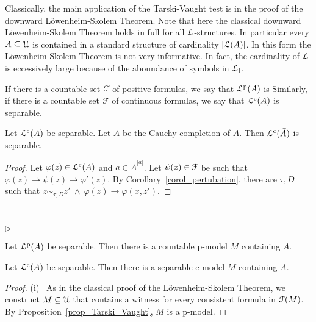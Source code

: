 \documentclass[10pt,oneside]{amsproc}
\newcommand{\mylabel}[1]{{#1}\hfill}
\renewenvironment{itemize}
  {\begin{list}{$\triangleright$}{%
  \setlength{\parskip}{0mm}
  \setlength{\topsep}{.4\baselineskip}
  \setlength{\rightmargin}{0mm}
  \setlength{\listparindent}{0mm}
  \setlength{\itemindent}{0mm}
  \setlength{\labelwidth}{3ex}
  \setlength{\itemsep}{.2\baselineskip}
  \setlength{\parsep}{.2\baselineskip}
  \setlength{\partopsep}{0mm}
  \setlength{\labelsep}{1ex}
  \setlength{\leftmargin}{\labelwidth+\labelsep}
  \let\makelabel\mylabel}}{%
\end{list}}
\renewcommand*{\emph}[1]{%
   \smash{\tikz[baseline]\node[rectangle, fill=teal!25, rounded corners, inner xsep=0.5ex, inner ysep=0.2ex, anchor=base, minimum height = 2.7ex]{\strut #1};}}
\begin{document}
{%

Classically, the main application of the Tarski-Vaught test is in the proof of the downward L\"owen\-heim-Skolem Theorem.
Note that here the classical downward L\"owenheim-Skolem Theorem holds in full for all ${\EuScript L}$-structures.
In particular every $A\subseteq{\EuScript U}$ is contained in a standard structure of cardinality $|{\EuScript L}(A)|$.
In this form the L\"owenheim-Skolem Theorem is not very informative.
In fact, the cardinality of ${\EuScript L}$ is eccessively large because of the aboundance of symbols in ${\EuScript L}_{\sf I}$.

If there is a countable set ${\EuScript F}$ of positive formulas, we say that ${\EuScript L}^{\rm p}(A)$ is \emph{separable.} 
Similarly, if there is a countable set ${\EuScript F}$ of continuous formulas, we say that ${\EuScript L}^{\rm c}(A)$ is separable. 

\begin{proposition}
  Let ${\EuScript L}^{\rm c}(A)$ be separable.
  Let $\bar A$ be the Cauchy completion of $A$.
  Then ${\EuScript L}^{\rm c}(\bar A)$ is separable. 
\end{proposition}

\begin{proof}
  Let $\varphi(z)\in{\EuScript L}^{\rm c}(A)$ and $a\in\bar A^{|a|}$.
  Let $\psi(z)\in{\EuScript F}$ be such that $\varphi(z)\rightarrow\psi(z)\rightarrow\varphi'(z)$.
  By Corollary~\ref{corol_pertubation}, there are $\tau,D$ such that $z\sim_{\tau,D}z'\ \wedge\ \varphi(z)\rightarrow\varphi(x,z')$.
\end{proof}


\begin{proposition}\label{prop_disjunction_dense}\ 
  \begin{itemize}
    \item[i.] Let ${\EuScript L}^{\rm p}(A)$ be separable.
    Then there is a countable p-model $M$ containing $A$.
  \item[ii.] Let ${\EuScript L}^{\rm c}(A)$ be separable.
  Then there is a separable c-model $M$ containing $A$.
  \end{itemize}
\end{proposition}

\begin{proof}
  (i) \ As in the classical proof of the L\"owenheim-Skolem Theorem, we construct $M\subseteq{\EuScript U}$ that contains a witness for every consistent formula in ${\EuScript F}(M)$.
  By Proposition~\ref{prop_Tarski_Vaught}, $M$ is a p-model.


\end{proof}}
\end{document}
